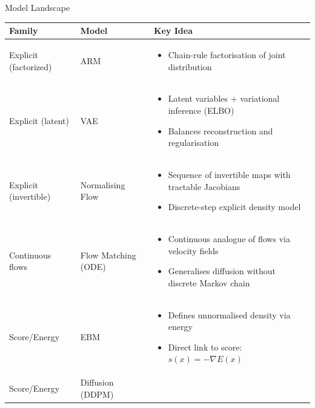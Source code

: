 \documentclass[xcolor=dvipsnames,aspectratio=169]{beamer}
\begin{document}
        \begin{frame}{Model Landscape}
            \tiny
            \renewcommand{\arraystretch}{1.3}
            \begin{tabularx}{\linewidth}{@{} l l X @{}}
                \toprule
                \textbf{Family} & \textbf{Model} & \textbf{Key Idea} \\
                \midrule
                Explicit (factorized) & ARM &
                \begin{itemize}
                  \item Chain-rule factorisation of joint distribution
                \end{itemize} \\
                Explicit (latent) & VAE &
                \begin{itemize}
                  \item Latent variables + variational inference (ELBO)
                  \item Balances reconstruction and regularisation
                \end{itemize} \\
                Explicit (invertible) & Normalising Flow &
                \begin{itemize}
                  \item Sequence of invertible maps with tractable Jacobians
                  \item Discrete-step explicit density model
                \end{itemize} \\
                Continuous flows & Flow Matching (ODE) &
                \begin{itemize}
                  \item Continuous analogue of flows via velocity fields
                  \item Generalises diffusion without discrete Markov chain
                \end{itemize} \\
                Score/Energy & EBM &
                \begin{itemize}
                  \item Defines unnormalised density via energy
                  \item Direct link to score: $s(x) = -\nabla E(x)$
                \end{itemize} \\
                Score/Energy & Diffusion (DDPM) &

\end{tabularx}
\end{frame}
\end{document}
